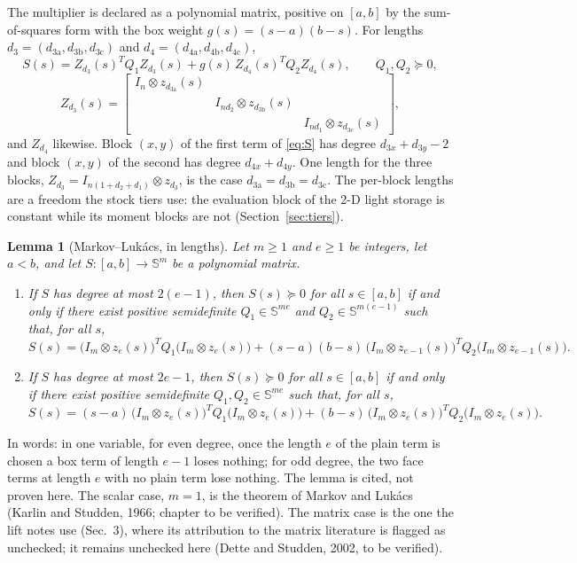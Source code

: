 \documentclass[12pt]{article}
\newcommand{\Sym}{\mathbb{S}}
\newcommand{\bmat}[1]{\begin{bmatrix} #1 \end{bmatrix}}
\newcommand{\ba}{\mathrm{a}}
\newcommand{\bb}{\mathrm{b}}
\newcommand{\bc}{\mathrm{c}}
\theoremstyle{plain}
\newtheorem{lemma}[theorem]{Lemma}
\theoremstyle{definition}
\theoremstyle{remark}
\begin{document}
The multiplier is declared as a polynomial matrix, positive on $[a,b]$ by the sum-of-squares form with the box weight $g(s)=(s-a)(b-s)$. For lengths $d_3=(d_{3\ba},d_{3\bb},d_{3\bc})$ and $d_4=(d_{4\ba},d_{4\bb},d_{4\bc})$,
\begin{equation}\label{eq:S}
S(s)=Z_{d_3}(s)^TQ_1Z_{d_3}(s)+g(s)\,Z_{d_4}(s)^TQ_2Z_{d_4}(s),\qquad Q_1,Q_2\succeq0,
\end{equation}
\begin{equation}\label{eq:Z3}
Z_{d_3}(s)=\bmat{I_n\otimes z_{d_{3\ba}}(s)&&\\&I_{nd_2}\otimes z_{d_{3\bb}}(s)&\\&&I_{nd_1}\otimes z_{d_{3\bc}}(s)},
\end{equation}
and $Z_{d_4}$ likewise. Block $(x,y)$ of the first term of \eqref{eq:S} has degree $d_{3x}+d_{3y}-2$ and block $(x,y)$ of the second has degree $d_{4x}+d_{4y}$. One length for the three blocks, $Z_{d_3}=I_{n(1+d_2+d_1)}\otimes z_{d_3}$, is the case $d_{3\ba}=d_{3\bb}=d_{3\bc}$. The per-block lengths are a freedom the stock tiers use: the evaluation block of the 2-D light storage is constant while its moment blocks are not (Section~\ref{sec:tiers}).

\begin{lemma}[Markov--Luk\'acs, in lengths]\label{lem:ml}
Let $m\ge1$ and $e\ge1$ be integers, let $a<b$, and let $S:[a,b]\to\Sym^m$ be a polynomial matrix.
\begin{enumerate}\setlength\itemsep{0pt}
\item[(i)] If $S$ has degree at most $2(e-1)$, then $S(s)\succeq0$ for all $s\in[a,b]$ if and only if there exist positive semidefinite $Q_1\in\Sym^{me}$ and $Q_2\in\Sym^{m(e-1)}$ such that, for all $s$,
\[
S(s)=\bigl(I_m\otimes z_{e}(s)\bigr)^TQ_1\bigl(I_m\otimes z_{e}(s)\bigr)+(s-a)(b-s)\,\bigl(I_m\otimes z_{e-1}(s)\bigr)^TQ_2\bigl(I_m\otimes z_{e-1}(s)\bigr).
\]
\item[(ii)] If $S$ has degree at most $2e-1$, then $S(s)\succeq0$ for all $s\in[a,b]$ if and only if there exist positive semidefinite $Q_1,Q_2\in\Sym^{me}$ such that, for all $s$,
\[
S(s)=(s-a)\,\bigl(I_m\otimes z_{e}(s)\bigr)^TQ_1\bigl(I_m\otimes z_{e}(s)\bigr)+(b-s)\,\bigl(I_m\otimes z_{e}(s)\bigr)^TQ_2\bigl(I_m\otimes z_{e}(s)\bigr).
\]
\end{enumerate}
\end{lemma}
In words: in one variable, for even degree, once the length $e$ of the plain term is chosen a box term of length $e-1$ loses nothing; for odd degree, the two face terms at length $e$ with no plain term lose nothing. The lemma is cited, not proven here. The scalar case, $m=1$, is the theorem of Markov and Luk\'acs (Karlin and Studden, 1966; chapter to be verified). The matrix case is the one the lift notes use (Sec.~3), where its attribution to the matrix literature is flagged as unchecked; it remains unchecked here (Dette and Studden, 2002, to be verified).
\end{document}
